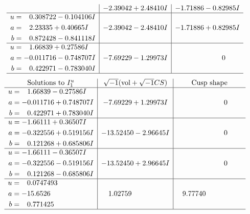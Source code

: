 \documentclass[1p]{elsarticle_modified}
\theoremstyle{definition}
\newcommand{\I}{\sqrt{-1}}
\begin{document}
$$\begin{array}{c|c|c}
 & -2.39042 + 2.48410 I & -1.71886 - 0.82985 I \\ \hline\begin{aligned}
u &= \phantom{-}0.308722 - 0.104106 I \\
a &= \phantom{-}2.23335 + 0.40665 I \\
b &= \phantom{-}0.872428 - 0.841118 I\end{aligned}
 & -2.39042 - 2.48410 I & -1.71886 + 0.82985 I \\ \hline\begin{aligned}
u &= \phantom{-}1.66839 + 0.27586 I \\
a &= -0.011716 - 0.748707 I \\
b &= \phantom{-}0.422971 - 0.783040 I\end{aligned}
 & -7.69229 - 1.29973 I & \phantom{-0.000000 } 0\\
 \hline 
 \end{array}$$\newpage$$\begin{array}{c|c|c}  
\text{Solutions to }I^u_{1}& \I (\text{vol} + \sqrt{-1}CS) & \text{Cusp shape}\\
 \hline 
\begin{aligned}
u &= \phantom{-}1.66839 - 0.27586 I \\
a &= -0.011716 + 0.748707 I \\
b &= \phantom{-}0.422971 + 0.783040 I\end{aligned}
 & -7.69229 + 1.29973 I & \phantom{-0.000000 } 0 \\ \hline\begin{aligned}
u &= -1.66111 + 0.36507 I \\
a &= -0.322556 + 0.519156 I \\
b &= \phantom{-}0.121268 + 0.685806 I\end{aligned}
 & -13.52450 - 2.96645 I & \phantom{-0.000000 } 0 \\ \hline\begin{aligned}
u &= -1.66111 - 0.36507 I \\
a &= -0.322556 - 0.519156 I \\
b &= \phantom{-}0.121268 - 0.685806 I\end{aligned}
 & -13.52450 + 2.96645 I & \phantom{-0.000000 } 0 \\ \hline\begin{aligned}
u &= \phantom{-}0.0747493\phantom{ +0.000000I} \\
a &= -15.6526\phantom{ +0.000000I} \\
b &= \phantom{-}0.771425\phantom{ +0.000000I}\end{aligned}
 & \phantom{-}1.02759\phantom{ +0.000000I} & \phantom{-}9.77740\phantom{ +0.000000I}\\
 \hline 
 \end{array}$$\newpage\newpage\renewcommand{\arraystretch}{1}
\end{document}
